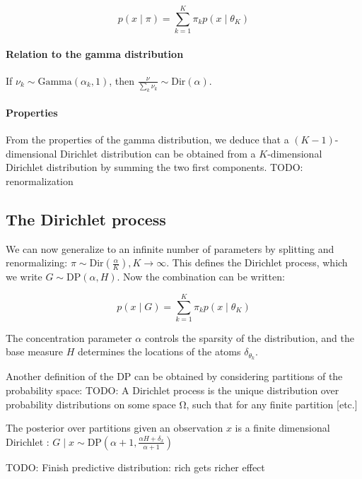 \documentclass[twoside]{article}
\newcommand{\Dir}{\mathrm{Dir}}
\newcommand{\Gam}{\mathrm{Gamma}}
\newcommand{\DP}{\mathrm{DP}}
\newcommand{\todo}[1]{{\color{red} TODO: #1}}
\begin{document}
$$ p(x \mid \pi) = \sum_{k=1}^K \pi_k p(x \mid \theta_K) $$

\paragraph{Relation to the gamma distribution}

If $\nu_k \sim \Gam(\alpha_k, 1)$, then $\frac{\nu}{\sum_k \nu_k} \sim \Dir(\alpha)$.

\paragraph{Properties}

From the properties of the gamma distribution, we deduce that a $(K-1)$-dimensional Dirichlet distribution can be obtained from a $K$-dimensional Dirichlet distribution by summing the two first components.
\todo{renormalization}

\subsection{The Dirichlet process}
We can now generalize to an infinite number of parameters by splitting and renormalizing: $\pi \sim \Dir(\frac{\alpha}{K}), K \longrightarrow \infty$. This defines the Dirichlet process, which we write $G \sim \DP(\alpha, H)$. Now the combination can be written:

$$ p(x \mid G) = \sum_{k=1}^K \pi_k p(x \mid \theta_K) $$

The concentration parameter $\alpha$ controls the sparsity of the distribution, and the base measure $H$ determines the locations of the atoms $\delta_{\theta_k}$.

Another definition of the DP can be obtained by considering partitions of the probability space: \todo{A Dirichlet process is the unique distribution over probability distributions on some space Ω, such that for any finite partition [etc.]}

The posterior over partitions given an observation $x$ is a finite dimensional Dirichlet :
$ G \mid x \sim \DP(\alpha+1, \frac{\alpha H + \delta_x}{\alpha + 1})$

\todo{Finish predictive distribution: rich gets richer effect}
\end{document}

